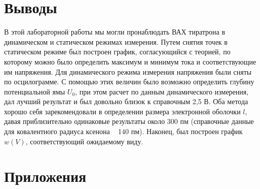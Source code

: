 \documentclass[a4paper, 12pt]{article}
\begin{document}
 \section{Выводы}
В этой лабораторной работы мы могли пронаблюдать ВАХ тиратрона в динамическом и статическом режимах измерения. Путем снятия точек в статическом режиме был построен график, согласующийся с теорией, по которому можно было определить максимум и минимум тока и соответствующие им напряжения. Для динамического режима измерения напряжения были сняты по осцилограмме. С помощью этих величин было возможно определить глубину потенциальной ямы $U_0$, при этом расчет по данным динамического измерения, дал лучший результат и был довольно близок к справочным 2,5 В. Оба метода хорошо себя зарекомендовали в определении размера электронной оболочки $l$, давая приблизительно одинаковые результаты около 300 пм (справочные данные для ковалентного радиуса ксенона ~ 140 пм). Наконец, был построен график $w(V)$, соответствующий ожидаемому виду.
\newpage
\section{Приложения}
\end{document}
